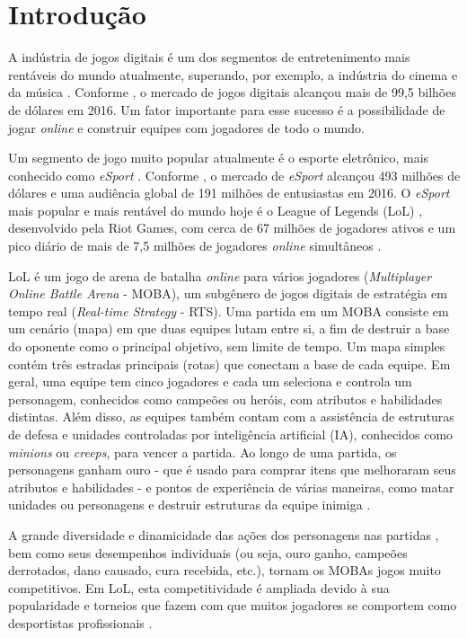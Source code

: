 \chapter{Introdu\c{c}\~{a}o}

A indústria de jogos digitais é um dos segmentos de entretenimento mais rentáveis do mundo atualmente, superando, por exemplo, a indústria do cinema e da música \cite{newzoo1} \cite{ifpi1} \cite{mpaa1}. Conforme \cite{newzoo1}, o mercado de jogos digitais alcançou mais de 99,5 bilhões de dólares em 2016. Um fator importante para esse sucesso é a possibilidade de jogar \textit{online} e construir equipes com jogadores de todo o mundo.

Um segmento de jogo muito popular atualmente é o esporte eletrônico, mais conhecido como \textit{eSport} \cite{forbes1}. Conforme \cite{newzoo2}, o mercado de \textit{eSport} alcançou 493 milhões de dólares e uma audiência global de 191 milhões de entusiastas em 2016. O \textit{eSport} mais popular e mais rentável do mundo hoje é o League of Legends (LoL)  \cite{superdata1}, desenvolvido pela Riot Games, com cerca de 67 milhões de jogadores ativos e um pico diário de mais de 7,5 milhões de jogadores \textit{online} simultâneos \cite{riot1}.

LoL é um jogo de arena de batalha \textit{online} para vários jogadores (\textit{Multiplayer Online Battle Arena} - MOBA), um subgênero de jogos digitais de estratégia em tempo real (\textit{Real-time Strategy} - RTS). Uma partida em um MOBA consiste em um cenário (mapa) em que duas equipes lutam entre si, a fim de destruir a base do oponente como o principal objetivo, sem limite de tempo. Um mapa simples contém três estradas principais (rotas) que conectam a base de cada equipe. Em geral, uma equipe tem cinco jogadores e cada um seleciona e controla um personagem, conhecidos como campeões ou heróis, com atributos e habilidades distintas. Além disso, as equipes também contam com a assistência de estruturas de defesa e unidades controladas por inteligência artificial (IA), conhecidos como \textit{minions} ou \textit{creeps}, para vencer a partida. Ao longo de uma partida, os personagens ganham ouro - que é usado para comprar itens que melhoraram seus atributos e habilidades - e pontos de experiência de várias maneiras, como matar unidades ou personagens e destruir estruturas da equipe inimiga \cite{league1}.

A grande diversidade e dinamicidade das ações dos personagens nas partidas \cite{drachen2014skill}, bem como seus desempenhos individuais (ou seja, ouro ganho, campeões derrotados, dano causado, cura recebida, etc.), tornam os MOBAs jogos muito competitivos. Em LoL, esta competitividade é ampliada devido à sua popularidade e torneios que fazem com que muitos jogadores se comportem como desportistas profissionais \cite{rioult2014mining}.

